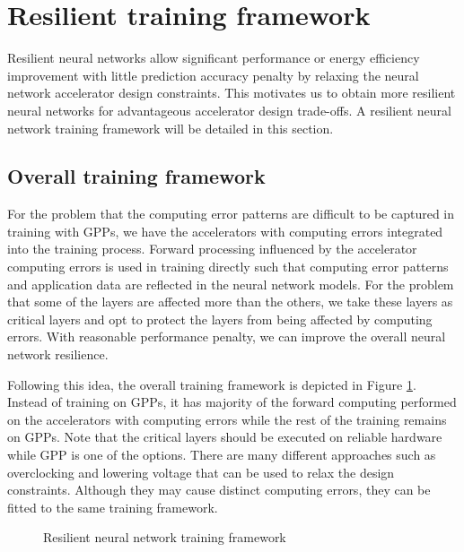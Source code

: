 \section{Resilient training framework} \label{sec:framework}
Resilient neural networks allow significant performance or 
energy efficiency improvement with little prediction accuracy penalty 
by relaxing the neural network accelerator design constraints. 
This motivates us to obtain more resilient neural networks 
for advantageous accelerator design trade-offs. 
A resilient neural network training framework will be 
detailed in this section. 

\subsection{Overall training framework}
For the problem that the computing error patterns are 
difficult to be captured in training with GPPs, 
we have the accelerators with computing errors integrated into 
the training process. Forward processing influenced by 
the accelerator computing errors is used in training directly 
such that computing error patterns and application data are 
reflected in the neural network models. For the problem that 
some of the layers are affected more than the others, 
we take these layers as critical layers and opt to 
protect the layers from being affected by computing errors. 
With reasonable performance penalty, we can improve the 
overall neural network resilience. 

Following this idea, the overall training framework is depicted in Figure \ref{fig:retrain}. 
Instead of training on GPPs, it has majority of the forward computing performed on the 
accelerators with computing errors while the rest of the training remains on GPPs.
Note that the critical layers should be executed on reliable hardware 
while GPP is one of the options. There are many different approaches 
such as overclocking and lowering voltage that can be used to relax the design constraints.
Although they may cause distinct computing errors, they can be fitted to the 
same training framework.

\begin{figure}
        \caption{Resilient neural network training framework}
        \label{fig:retrain}
\end{figure}

